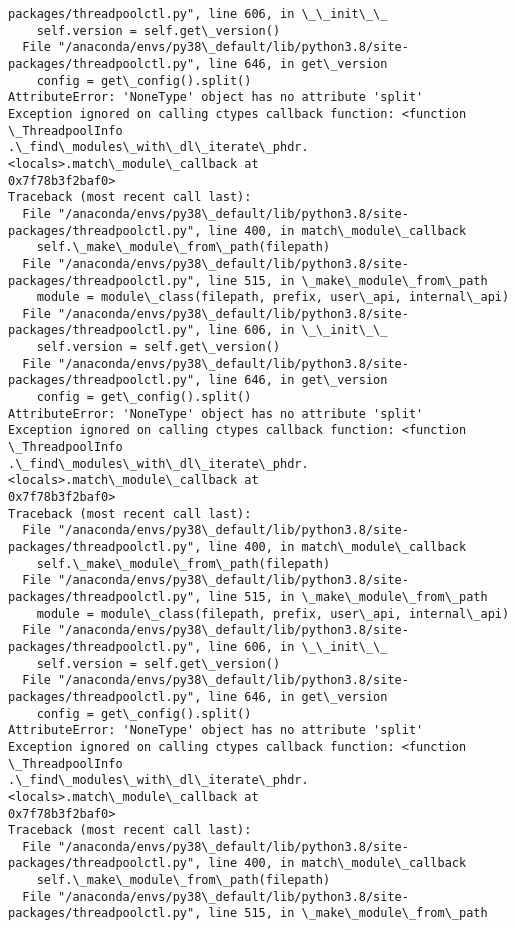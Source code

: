 \documentclass[11pt]{article}
\begin{document}
\begin{Verbatim}[commandchars=\\\{\}]
packages/threadpoolctl.py", line 606, in \_\_init\_\_
    self.version = self.get\_version()
  File "/anaconda/envs/py38\_default/lib/python3.8/site-
packages/threadpoolctl.py", line 646, in get\_version
    config = get\_config().split()
AttributeError: 'NoneType' object has no attribute 'split'
Exception ignored on calling ctypes callback function: <function \_ThreadpoolInfo
.\_find\_modules\_with\_dl\_iterate\_phdr.<locals>.match\_module\_callback at
0x7f78b3f2baf0>
Traceback (most recent call last):
  File "/anaconda/envs/py38\_default/lib/python3.8/site-
packages/threadpoolctl.py", line 400, in match\_module\_callback
    self.\_make\_module\_from\_path(filepath)
  File "/anaconda/envs/py38\_default/lib/python3.8/site-
packages/threadpoolctl.py", line 515, in \_make\_module\_from\_path
    module = module\_class(filepath, prefix, user\_api, internal\_api)
  File "/anaconda/envs/py38\_default/lib/python3.8/site-
packages/threadpoolctl.py", line 606, in \_\_init\_\_
    self.version = self.get\_version()
  File "/anaconda/envs/py38\_default/lib/python3.8/site-
packages/threadpoolctl.py", line 646, in get\_version
    config = get\_config().split()
AttributeError: 'NoneType' object has no attribute 'split'
Exception ignored on calling ctypes callback function: <function \_ThreadpoolInfo
.\_find\_modules\_with\_dl\_iterate\_phdr.<locals>.match\_module\_callback at
0x7f78b3f2baf0>
Traceback (most recent call last):
  File "/anaconda/envs/py38\_default/lib/python3.8/site-
packages/threadpoolctl.py", line 400, in match\_module\_callback
    self.\_make\_module\_from\_path(filepath)
  File "/anaconda/envs/py38\_default/lib/python3.8/site-
packages/threadpoolctl.py", line 515, in \_make\_module\_from\_path
    module = module\_class(filepath, prefix, user\_api, internal\_api)
  File "/anaconda/envs/py38\_default/lib/python3.8/site-
packages/threadpoolctl.py", line 606, in \_\_init\_\_
    self.version = self.get\_version()
  File "/anaconda/envs/py38\_default/lib/python3.8/site-
packages/threadpoolctl.py", line 646, in get\_version
    config = get\_config().split()
AttributeError: 'NoneType' object has no attribute 'split'
Exception ignored on calling ctypes callback function: <function \_ThreadpoolInfo
.\_find\_modules\_with\_dl\_iterate\_phdr.<locals>.match\_module\_callback at
0x7f78b3f2baf0>
Traceback (most recent call last):
  File "/anaconda/envs/py38\_default/lib/python3.8/site-
packages/threadpoolctl.py", line 400, in match\_module\_callback
    self.\_make\_module\_from\_path(filepath)
  File "/anaconda/envs/py38\_default/lib/python3.8/site-
packages/threadpoolctl.py", line 515, in \_make\_module\_from\_path

\end{Verbatim}
\end{document}
